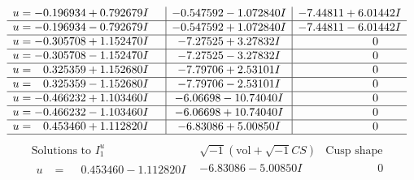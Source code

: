 \documentclass[1p]{elsarticle_modified}
\theoremstyle{definition}
\newcommand{\I}{\sqrt{-1}}
\begin{document}
$$\begin{array}{c|c|c}
\begin{aligned}
u &= -0.196934 + 0.792679 I\end{aligned}
 & -0.547592 - 1.072840 I & -7.44811 + 6.01442 I \\ \hline\begin{aligned}
u &= -0.196934 - 0.792679 I\end{aligned}
 & -0.547592 + 1.072840 I & -7.44811 - 6.01442 I \\ \hline\begin{aligned}
u &= -0.305708 + 1.152470 I\end{aligned}
 & -7.27525 + 3.27832 I & \phantom{-0.000000 } 0 \\ \hline\begin{aligned}
u &= -0.305708 - 1.152470 I\end{aligned}
 & -7.27525 - 3.27832 I & \phantom{-0.000000 } 0 \\ \hline\begin{aligned}
u &= \phantom{-}0.325359 + 1.152680 I\end{aligned}
 & -7.79706 + 2.53101 I & \phantom{-0.000000 } 0 \\ \hline\begin{aligned}
u &= \phantom{-}0.325359 - 1.152680 I\end{aligned}
 & -7.79706 - 2.53101 I & \phantom{-0.000000 } 0 \\ \hline\begin{aligned}
u &= -0.466232 + 1.103460 I\end{aligned}
 & -6.06698 - 10.74040 I & \phantom{-0.000000 } 0 \\ \hline\begin{aligned}
u &= -0.466232 - 1.103460 I\end{aligned}
 & -6.06698 + 10.74040 I & \phantom{-0.000000 } 0 \\ \hline\begin{aligned}
u &= \phantom{-}0.453460 + 1.112820 I\end{aligned}
 & -6.83086 + 5.00850 I & \phantom{-0.000000 } 0\\
 \hline 
 \end{array}$$\newpage$$\begin{array}{c|c|c}  
\text{Solutions to }I^u_{1}& \I (\text{vol} + \sqrt{-1}CS) & \text{Cusp shape}\\
 \hline 
\begin{aligned}
u &= \phantom{-}0.453460 - 1.112820 I\end{aligned}
 & -6.83086 - 5.00850 I & \phantom{-0.000000 } 0 \\ \hline\begin{aligned}

\end{aligned}
\end{array}$$
\end{document}
